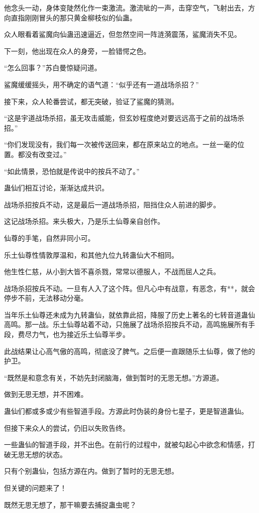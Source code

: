 \begin{this_body}
他念头一动，身体变陡然化作一束激流。激流呲的一声，击穿空气，飞射出去，方向直指刚刚冒头的那只黄金柳枝似的仙蛊。

众人眼看着鲨魔向仙蛊迅速逼近，但忽然空间一阵涟漪震荡，鲨魔消失不见。

下一刻，他出现在众人的身旁，一脸错愕之色。

“怎么回事？”苏白曼惊疑问道。

鲨魔缓缓摇头，用不确定的语气道：“似乎还有一道战场杀招？”

接下来，众人轮番尝试，都无突破，验证了鲨魔的猜测。

“这是宇道战场杀招，虽无攻击威能，但玄妙程度绝对要远远高于之前的战场杀招。”

“你们发现没有，我们每一次被传送回来，都在原来站立的地点。一丝一毫的位置。都没有改变过。”

“如此情景，恐怕就是传说中的按兵不动了。”

蛊仙们相互讨论，渐渐达成共识。

战场杀招按兵不动，这是最后一道战场杀招，阻挡住众人前进的脚步。

这记战场杀招。来头极大，乃是乐土仙尊亲自创作。

仙尊的手笔，自然非同小可。

乐土仙尊性情敦厚温和，和其他九位九转蛊仙大不相同。

他生性仁慈，从小到大皆不喜杀戮，常常以德服人，不战而屈人之兵。

战场杀招按兵不动。一旦有人入了这个阵。但凡心中有战意，有恶念，有**，就会停步不前，无法移动分毫。

当年乐土仙尊还未成为九转蛊仙，就依靠此招，降服了历史上著名的七转音道蛊仙高鸣。那一战。乐土仙尊站着不动，只施展了战场杀招按兵不动，高鸣施展所有手段，费尽力气，也为接近乐土仙尊半步。

此战结果让心高气傲的高鸣，彻底没了脾气。之后便一直跟随乐土仙尊，做了他的护卫。

“既然是和意念有关，不妨先封闭脑海，做到暂时的无思无想。”方源道。

做到无思无想，并不困难。

蛊仙们都或多或少有些智道手段。方源此时伪装的身份七星子，更是智道蛊仙。

但接下来众人的尝试，仍旧以失败告终。

一些蛊仙的智道手段，并不出色。在前行的过程中，就被勾起心中欲念和情感，打破无思无想的状态。

只有个别蛊仙，包括方源在内。做到了暂时的无思无想。

但关键的问题来了！

既然无思无想了，那干嘛要去捕捉蛊虫呢？


\end{this_body}
